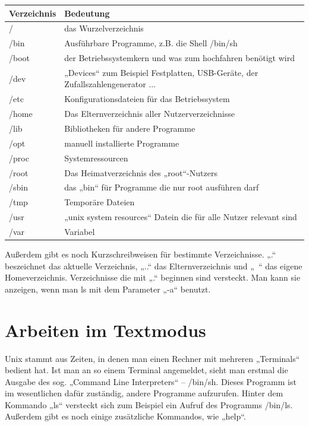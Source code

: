 \begin{table}
\centering
\begin{tabular}{l|l}
Verzeichnis & Bedeutung \\ \hline
/ & das Wurzelverzeichnis \\
/bin & Ausführbare Programme, z.B. die Shell /bin/sh \\
/boot & der Betriebssystemkern und was zum hochfahren benötigt wird \\
/dev & „Devices“ zum Beispiel Festplatten, USB-Geräte, der Zufallszahlengenerator ...\\
/etc & Konfigurationsdateien für das Betriebssystem \\
/home & Das Elternverzeichnis aller Nutzerverzeichnisse \\
/lib & Bibliotheken für andere Programme \\
/opt & manuell installierte Programme \\
/proc & Systemressourcen \\
/root & Das Heimatverzeichnis des „root“-Nutzers \\
/sbin & das „bin“ für Programme die nur root ausführen darf \\
/tmp & Temporäre Dateien \\
/usr & „unix system resources“ Datein die für alle Nutzer relevant sind \\
/var & Variabel
\end{tabular}
\label{UNIX-Verzeichnisse}
\end{table}

Außerdem gibt es noch Kurzschreibweisen für bestimmte Verzeichnisse. „.“ beszeichnet das aktuelle Verzeichnis, „..“ das Elternverzeichnis und „~“ das eigene Homeverzeichnis.
Verzeichnisse die mit „.“ beginnen sind versteckt. Man kann sie anzeigen, wenn man ls mit dem Parameter „-a“ benutzt.

\section{Arbeiten im Textmodus}
Unix stammt aus Zeiten, in denen man einen Rechner mit mehreren „Terminals“ bedient hat. 
Ist man an so einem Terminal angemeldet, sieht man erstmal die Ausgabe des sog. „Command Line Interpreters“ – /bin/sh.
Dieses Programm ist im wesentlichen dafür zuständig, andere Programme aufzurufen. Hinter dem Kommando „ls“ versteckt sich zum Beispiel ein Aufruf des Programms /bin/ls. Außerdem gibt es noch einige zusätzliche Kommandos, wie „help“. 

